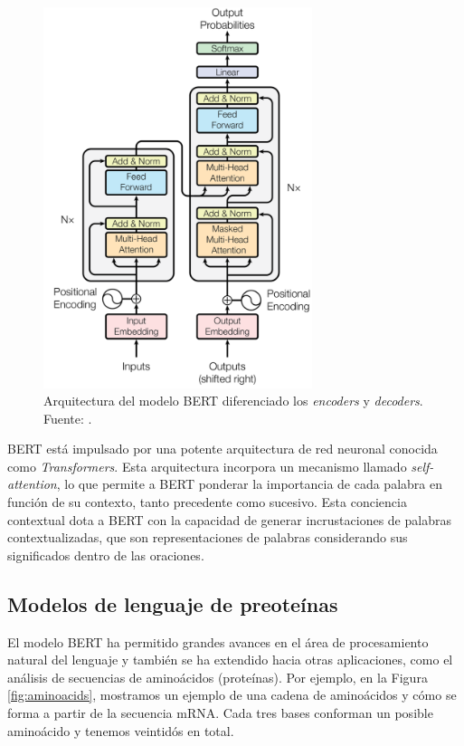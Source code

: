 \begin{figure}[H]
	\centering\includegraphics[width=0.7\textwidth]{../img/proposal/bert}
	\caption[Aquitectura del modelo BERT]{Arquitectura del modelo BERT diferenciado los \textit{encoders} y \textit{decoders}. Fuente: \cite{devlin2018bert}.}
	\label{fig:bert_paper}
\end{figure}


BERT está impulsado por una potente arquitectura de red neuronal conocida como \textit{Transformers}. Esta arquitectura incorpora un mecanismo llamado \textit{self-attention}, lo que permite a BERT ponderar la importancia de cada palabra en función de su contexto, tanto precedente como sucesivo. Esta conciencia contextual dota a BERT con la capacidad de generar incrustaciones de palabras contextualizadas, que son representaciones de palabras considerando sus significados dentro de las oraciones. 

\subsection{Modelos de lenguaje de preoteínas}

El modelo BERT ha permitido grandes avances en el área de procesamiento natural del lenguaje y también se ha extendido hacia otras aplicaciones, como el análisis de secuencias de aminoácidos (proteínas). Por ejemplo, en la Figura \ref{fig:aminoacids}, mostramos un ejemplo de una cadena de aminoácidos y cómo se forma a partir de la secuencia mRNA. Cada tres bases conforman un posible aminoácido y tenemos veintidós en total.


